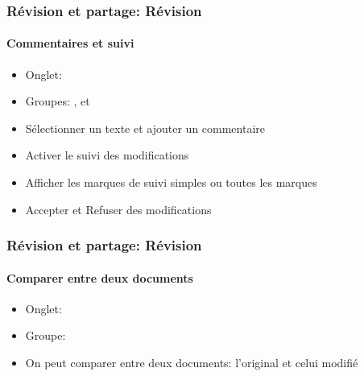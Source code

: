 \documentclass[xcolor=table]{beamer}
\begin{document}
\begin{frame}[t]
\frametitle{Révision et partage: Révision}
\framesubtitle{Commentaires et suivi}

\begin{minipage}{0.39\textwidth}
	\begin{itemize}
		\item Onglet: 
		\item Groupes: ,  et 
	\end{itemize}
\end{minipage}
\begin{minipage}{0.6\textwidth}
\end{minipage}

\begin{minipage}{0.69\textwidth}
	\begin{itemize}
		\item Sélectionner un texte et ajouter un commentaire 
		\item Activer le suivi des modifications
		\item Afficher les marques de suivi simples ou toutes les marques
		\item Accepter et Refuser des modifications
	\end{itemize}
\end{minipage}
\begin{minipage}{0.30\textwidth}
	
	
	
\end{minipage}

\end{frame}


\begin{frame}
\frametitle{Révision et partage: Révision}
\framesubtitle{Comparer entre deux documents}

\begin{minipage}{0.41\textwidth}
	\begin{itemize}
		\item Onglet: 
		\item Groupe: 
		\item On peut comparer entre deux documents: l'original et celui modifié 
	\end{itemize}
\end{minipage}
\begin{minipage}{0.58\textwidth}
	
	
\end{minipage}

\end{frame}
\end{document}
